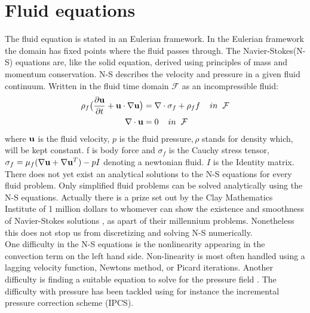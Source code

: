 
\section{Fluid equations}
The fluid equation is stated in an Eulerian framework. In the Eulerian framework the domain has fixed points where the fluid passes through. 
The Navier-Stokes(N-S) equations are, like the solid equation, derived using principles of mass and momentum conservation. N-S describes the velocity and pressure in a given fluid continuum. Written in the fluid time domain $\mathcal{F}$ as an incompressible fluid:
\begin{align}
\label{eq:NS}
\rho_f\big( \frac{\partial \bold{u}}{\partial t} +  \bold{u} \cdot \nabla \bold{u}\big) &= \nabla \cdot \sigma_f + \rho_ff  \hspace{4mm} in \hspace{2mm} \mathcal{F}\\
\nabla \cdot \bold{u} &= 0 \hspace{4mm} in \hspace{2mm} \mathcal{F}
\end{align}
where $\bold{u}$ is the fluid velocity, $p$ is the fluid pressure$, \rho$ stands for density which, will be kept constant. f is body force and $\sigma_f$ is the Cauchy stress tensor, $ \sigma_f = \mu_f (\nabla \bold{u} + \nabla \bold{u}^T)  - pI$ denoting a newtonian fluid. $I$ is the Identity matrix. \\

There does not yet exist an analytical solutions to the N-S equations for every fluid problem. Only simplified fluid problems can be solved \cite{White2000} analytically using the N-S equations. Actually there is a prize set out by the Clay Mathematics Institute of 1 million dollars to whomever can show the existence and smoothness of Navier-Stokes solutions \cite{Fefferman2000}, as apart of their millennium problems. 
Nonetheless this does not stop us from discretizing and solving N-S numerically. \\

One difficulty in the N-S equations is the nonlinearity appearing in the convection term on the left hand side. Non-linearity is most often handled using a lagging velocity function, Newtons method, or Picard iterations. Another difficulty is finding a suitable equation to solve for the pressure field \cite{Charlesworth}. The difficulty with pressure has been tackled using for instance the incremental pressure correction scheme (IPCS).